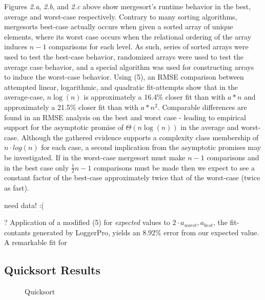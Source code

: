 \documentclass[11pt,letterpaper]{report}
\begin{document}
Figures \emph{2.a}, \emph{2.b}, and \emph{2.c} above show mergesort's runtime behavior in the best, average and worst-case respectively. Contrary to many sorting algorithms, mergesorts best-case actually occurs when given a sorted array of unique elements, where its worst case occurs when the relational ordering of the array induces $n-1$ comparisons for each level. As such, series of sorted arrays were used to test the best-case behavior, randomized arrays were used to test the average case behavior, and a special algorithm was used for constructing arrays to induce the worst-case behavior.
Using (5), an RMSE comparison between attempted linear, logarithmic, and quadratic fit-attempts show that in the average-case, $n\log{}(n)$ is approximately a 16.4\% closer fit than with $a*n$ and approximately a 21.5\% closer fit than with $a*n^2$. Comparable differences are found in an RMSE analysis on the best and worst case - leading to empirical support for the asymptotic promise of $\Theta(n\log{}(n))$ in the average and worst-case.
Although the gathered evidence supports a complexity class membership of $n \cdot log{}(n)$ for each case, a second implication from the asymptotic promises may be investigated. If in the worst-case mergesort must make $n-1$ comparisons and in the best case only $\frac{1}{2}n-1$ comparisons must be made then we expect to see a constant factor of the best-case approximately twice that of the worst-case (twice as fast). 

need data! :(

? Application of a modified (5) for \emph{expected} values to $2 \cdot a_{worst}, a_{best}$, the fit-contants generated by LoggerPro, yields an 8.92\% error from our expected value. A remarkable fit for 

\subsection*{Quicksort Results}
\begin{figure}[h]
  \centering
  \hfill
  \caption{Quicksort}
\end{figure}
\end{document}
